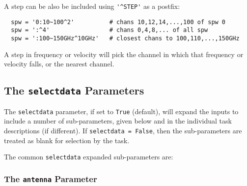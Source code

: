 
A step can be also be included using {\verb!'^STEP'!} as a postfix:
\small
\begin{verbatim}
  spw = '0:10~100^2'          # chans 10,12,14,...,100 of spw 0
  spw = ':^4'                 # chans 0,4,8,... of all spw
  spw = ':100~150GHz^10GHz'   # closest chans to 100,110,...,150GHz
\end{verbatim}
\normalsize
A step in frequency or velocity will pick the channel in which that
frequency or velocity falls, or the nearest channel.

\subsection{The {\tt selectdata} Parameters}
\label{section:io.selection.selectdata}

The {\tt selectdata} parameter, if set to {\tt True} (default), will expand
the inputs to include a number of sub-parameters, given below and
in the individual task descriptions (if different).  If 
{\tt selectdata = False}, then the sub-parameters are treated as
blank for selection by the task.  

The common {\tt selectdata} expanded sub-parameters are:

\subsubsection{The {\tt antenna} Parameter}
\label{section:io.selection.selectdata.antenna}

